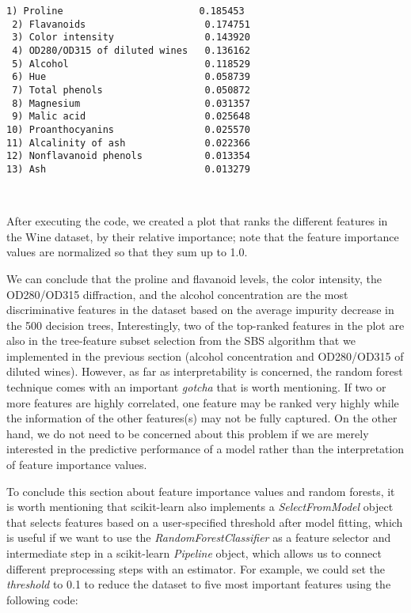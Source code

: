 \documentclass[11pt]{article}
\begin{document}
    \begin{Verbatim}[commandchars=\\\{\}]
 1) Proline                        0.185453
 2) Flavanoids                     0.174751
 3) Color intensity                0.143920
 4) OD280/OD315 of diluted wines   0.136162
 5) Alcohol                        0.118529
 6) Hue                            0.058739
 7) Total phenols                  0.050872
 8) Magnesium                      0.031357
 9) Malic acid                     0.025648
10) Proanthocyanins                0.025570
11) Alcalinity of ash              0.022366
12) Nonflavanoid phenols           0.013354
13) Ash                            0.013279

    \end{Verbatim}

    \begin{center}
    \end{center}
    { \hspace*{\fill} \\}
    
    After executing the code, we created a plot that ranks the different
features in the Wine dataset, by their relative importance; note that
the feature importance values are normalized so that they sum up to 1.0.

We can conclude that the proline and flavanoid levels, the color
intensity, the OD280/OD315 diffraction, and the alcohol concentration
are the most discriminative features in the dataset based on the average
impurity decrease in the 500 decision trees, Interestingly, two of the
top-ranked features in the plot are also in the tree-feature subset
selection from the SBS algorithm that we implemented in the previous
section (alcohol concentration and OD280/OD315 of diluted wines).
However, as far as interpretability is concerned, the random forest
technique comes with an important \emph{gotcha} that is worth
mentioning. If two or more features are highly correlated, one feature
may be ranked very highly while the information of the other features(s)
may not be fully captured. On the other hand, we do not need to be
concerned about this problem if we are merely interested in the
predictive performance of a model rather than the interpretation of
feature importance values.

To conclude this section about feature importance values and random
forests, it is worth mentioning that scikit-learn also implements a
\emph{SelectFromModel} object that selects features based on a
user-specified threshold after model fitting, which is useful if we want
to use the \emph{RandomForestClassifier} as a feature selector and
intermediate step in a scikit-learn \emph{Pipeline} object, which allows
us to connect different preprocessing steps with an estimator. For
example, we could set the \emph{threshold} to 0.1 to reduce the dataset
to five most important features using the following code:
\end{document}
